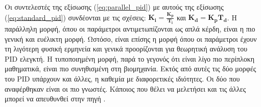 Οι συντελεστές της εξίσωσης (\ref{eq:parallel_pid}) με αυτούς της εξίσωσης (\ref{eq:standard_pid}) συνδέονται με τις σχέσεις: $\boldsymbol{K_i=\frac{K_p}{T_i}}$ και $\boldsymbol{K_d=K_p T_d}$. Η παράλληλη μορφή, όπου οι παράμετροι αντιμετωπίζονται ως απλά κέρδη, είναι η πιο γενική και ευέλικτη μορφή. Ωστόσο, είναι επίσης η μορφή όπου οι παράμετροι έχουν τη λιγότερη φυσική ερμηνεία και γενικά προορίζονται για θεωρητική ανάλυση του PID ελεγκτή. Η τυποποιημένη μορφή, παρά το γεγονός ότι είναι λίγο πιο περίπλοκη μαθηματικά, είναι πιο συνηθισμένη στη βιομηχανία. Εκτός από αυτές τις δύο μορφές του PID υπάρχουν και άλλες, η καθεμία με διαφορετικές ιδιότητες. Οι δύο που αναφέρθηκαν είναι οι πιο γνωστές. Κάποιος που θέλει να μελετήσει και τις άλλες μπορεί να απευθυνθεί στην πηγή \cite{astrom}.



%
